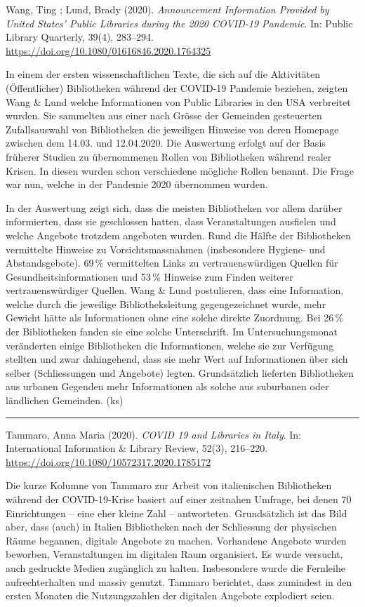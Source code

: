 \documentclass[a4paper,
fontsize=11pt,
oneside,
numbers=noperiodatend,
parskip=half-,
bibliography=totoc,
final
]{scrartcl}
\begin{document}
Wang, Ting ; Lund, Brady (2020). \emph{Announcement Information Provided
by United States' Public Libraries during the 2020 COVID-19 Pandemic}.
In: Public Library Quarterly, 39(4), 283--294.
\url{https://doi.org/10.1080/01616846.2020.1764325}

In einem der ersten wissenschaftlichen Texte, die sich auf die
Aktivitäten (Öffentlicher) Bibliotheken während der COVID-19 Pandemie
beziehen, zeigten Wang \& Lund welche Informationen von Public Libraries
in den USA verbreitet wurden. Sie sammelten aus einer nach Grösse der
Gemeinden gesteuerten Zufallsauswahl von Bibliotheken die jeweiligen
Hinweise von deren Homepage zwischen dem 14.03. und 12.04.2020. Die
Auswertung erfolgt auf der Basis früherer Studien zu übernommenen Rollen
von Bibliotheken während realer Krisen. In diesen wurden schon
verschiedene mögliche Rollen benannt. Die Frage war nun, welche in der
Pandemie 2020 übernommen wurden.

In der Auswertung zeigt sich, dass die meisten Bibliotheken vor allem
darüber informierten, dass sie geschlossen hatten, dass Veranstaltungen
ausfielen und welche Angebote trotzdem angeboten wurden. Rund die Hälfte
der Bibliotheken vermittelte Hinweise zu Vorsichtsmassnahmen
(insbesondere Hygiene- und Abstandsgebote). 69\,\% vermittelten Links zu
vertrauenswürdigen Quellen für Gesundheitsinformationen und 53\,\%
Hinweise zum Finden weiterer vertrauenswürdiger Quellen. Wang \& Lund
postulieren, dass eine Information, welche durch die jeweilige
Bibliotheksleitung gegengezeichnet wurde, mehr Gewicht hätte als
Informationen ohne eine solche direkte Zuordnung. Bei 26\,\% der
Bibliotheken fanden sie eine solche Unterschrift. Im Untersuchungsmonat
veränderten einige Bibliotheken die Informationen, welche sie zur
Verfügung stellten und zwar dahingehend, dass sie mehr Wert auf
Informationen über sich selber (Schliessungen und Angebote) legten.
Grundsätzlich lieferten Bibliotheken aus urbanen Gegenden mehr
Informationen als solche aus suburbanen oder ländlichen Gemeinden. (ks)

\begin{center}\rule{0.5\linewidth}{0.5pt}\end{center}

Tammaro, Anna Maria (2020). \emph{COVID 19 and Libraries in Italy}. In:
International Information \& Library Review, 52(3), 216--220.
\url{https://doi.org/10.1080/10572317.2020.1785172}

Die kurze Kolumne von Tammaro zur Arbeit von italienischen Bibliotheken
während der COVID-19-Krise basiert auf einer zeitnahen Umfrage, bei
denen 70 Einrichtungen -- eine eher kleine Zahl -- antworteten.
Grundsätzlich ist das Bild aber, dass (auch) in Italien Bibliotheken
nach der Schliessung der physischen Räume begannen, digitale Angebote zu
machen. Vorhandene Angebote wurden beworben, Veranstaltungen im
digitalen Raum organisiert. Es wurde versucht, auch gedruckte Medien
zugänglich zu halten. Insbesondere wurde die Fernleihe aufrechterhalten
und massiv genutzt. Tammaro berichtet, dass zumindest in den ersten
Monaten die Nutzungszahlen der digitalen Angebote explodiert seien.
\end{document}
